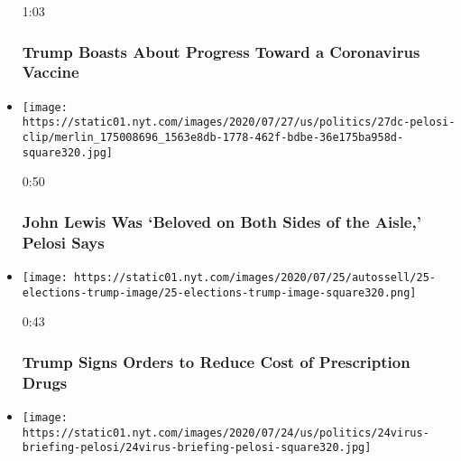 \begin{itemize}
  1:03

  \hypertarget{trump-boasts-about-progress-toward-a-coronavirus-vaccine}{%
  \subsubsection{Trump Boasts About Progress Toward a Coronavirus
  Vaccine}\label{trump-boasts-about-progress-toward-a-coronavirus-vaccine}}
\item
  \href{https://www.nytimes.com/video/us/100000007259050/john-lewis-memorial-pelosi.html?action=click\&module=video-series-bar\&region=header\&pgtype=Article\&playlistId=video/us-politics}{}

  \texttt{[image: https://static01.nyt.com/images/2020/07/27/us/politics/27dc-pelosi-clip/merlin\_175008696\_1563e8db-1778-462f-bdbe-36e175ba958d-square320.jpg]}

  0:50

  \hypertarget{john-lewis-was-beloved-on-both-sides-of-the-aisle-pelosi-says}{%
  \subsubsection{John Lewis Was `Beloved on Both Sides of the Aisle,'
  Pelosi
  Says}\label{john-lewis-was-beloved-on-both-sides-of-the-aisle-pelosi-says}}
\item
  \href{https://www.nytimes.com/video/us/100000007255909/trump-executive-order-prescription-drugs.html?action=click\&module=video-series-bar\&region=header\&pgtype=Article\&playlistId=video/us-politics}{}

  \texttt{[image: https://static01.nyt.com/images/2020/07/25/autossell/25-elections-trump-image/25-elections-trump-image-square320.png]}

  0:43

  \hypertarget{trump-signs-orders-to-reduce-cost-of-prescription-drugs}{%
  \subsubsection{Trump Signs Orders to Reduce Cost of Prescription
  Drugs}\label{trump-signs-orders-to-reduce-cost-of-prescription-drugs}}
\item
  \href{https://www.nytimes.com/video/us/100000007256158/pelosi-rejects-unemployment-extension.html?action=click\&module=video-series-bar\&region=header\&pgtype=Article\&playlistId=video/us-politics}{}

  \texttt{[image: https://static01.nyt.com/images/2020/07/24/us/politics/24virus-briefing-pelosi/24virus-briefing-pelosi-square320.jpg]}


\end{itemize}
